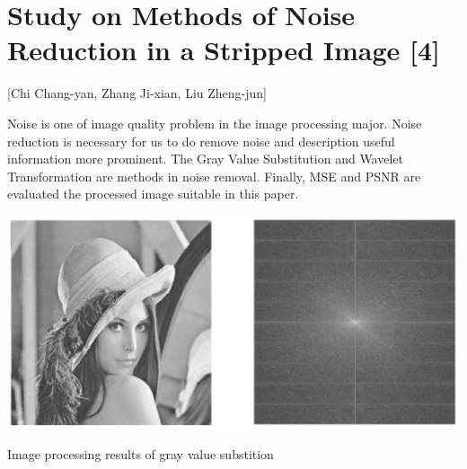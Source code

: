 \section{Study on Methods of Noise Reduction in a Stripped Image [4]}

[Chi Chang-yan, Zhang Ji-xian, Liu Zheng-jun]


Noise is one of  image quality problem in the image processing major. Noise reduction is necessary for us to do remove noise and description useful information more prominent. The Gray Value Substitution and Wavelet Transformation are methods in noise removal. Finally, MSE and PSNR are evaluated the processed image suitable in this paper.





\begin{center}
\includegraphics{gray.png}

 Image processing results of gray value substition 
\end{center}

